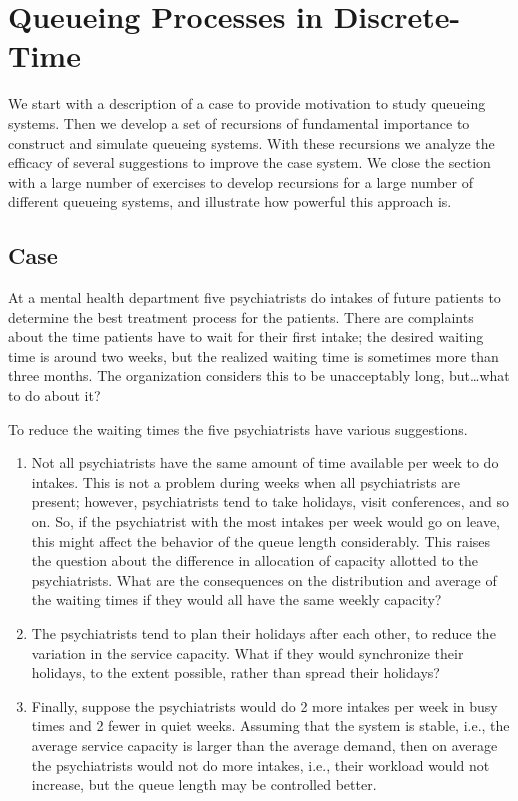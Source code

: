 \section{Queueing Processes in Discrete-Time}
\label{sec:constr-discr-time}


We start with a description of a case to provide motivation to study queueing systems.
Then we develop a set of recursions of fundamental importance to construct and simulate queueing systems.
With these recursions we analyze the efficacy of several suggestions to improve the case system.
We close the section with a large number of exercises to develop recursions for a large number of different queueing systems, and illustrate how powerful this approach is.

\subsection*{Case}
\label{sec:case}

At a mental health department five psychiatrists do intakes of future patients to determine the best treatment process for the patients.
There are complaints about the time patients have to wait for their first intake; the desired waiting time is around two weeks, but the realized waiting time is sometimes more than three months.
The organization considers this to be unacceptably long, but\ldots what to do about it?

To reduce the waiting times the five psychiatrists have various
suggestions. 
\begin{enumerate}
\item Not all psychiatrists have the same amount of time available per week to do intakes.
  This is not a problem during weeks when all psychiatrists are present; however, psychiatrists tend to take holidays, visit conferences, and so on.
  So, if the psychiatrist with the most intakes per week would go on leave, this might affect the behavior of the queue length considerably.
  This raises the question about the difference in allocation of capacity allotted to the psychiatrists.
  What are the consequences on the distribution and average of the waiting times if they would all have the same weekly capacity?
\item The psychiatrists tend to plan their holidays after each other, to reduce the variation in the service capacity.
  What if they would synchronize their holidays, to the extent possible, rather than spread their holidays?
\item Finally, suppose the psychiatrists would do 2 more intakes per week in busy times and 2 fewer in quiet weeks.
  Assuming that the system is stable, i.e., the average service capacity is larger than the average demand, then on average the psychiatrists would not do more intakes, i.e., their workload would not increase, but the queue length may be controlled better.
\end{enumerate}

